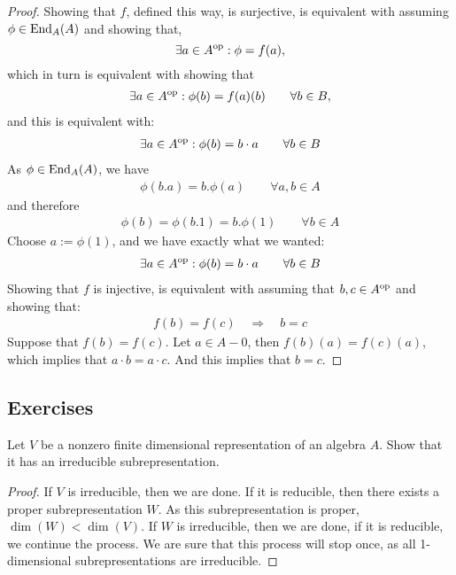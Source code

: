 \begin{proof}
Showing that \(f\), defined this way, is surjective, is equivalent with assuming \(\phi \in \operatorname{End}_{A} (A)\) and showing that,
\[
\exists a\in A^{\operatorname{op}}\space : \space \phi =f(a),
\]
which in turn is equivalent with showing that
\begin{align*}
\exists a\in A^{\operatorname{op}}\space : \space \phi (b)=f(a)(b) \qquad \forall b\in B,
\end{align*}
and this is equivalent with:
\begin{align*}
\exists a\in A^{\operatorname{op}}\space : \space \phi (b)=b\cdot a \qquad \forall b\in B
\end{align*}
As \(\phi \in \operatorname{End}_{A} (A)\), we have
\begin{align*}
\phi (b.a)=b.\phi (a) \qquad \forall a,b\in A
\end{align*}
and therefore
\begin{align*}
\phi (b)=\phi (b.1)=b.\phi (1) \qquad \forall b\in A
\end{align*}
Choose \(a:=\phi (1)\), and we have exactly what we wanted:
\begin{align*}
\exists a\in A^{\operatorname{op}}\space : \space \phi (b)=b\cdot a \qquad \forall b\in B
\end{align*}
Showing that \(f\) is injective, is equivalent with assuming that \(b,c\in A^{\operatorname{op}}\) and showing that:
\begin{align*}
f(b)=f(c) \quad \Longrightarrow  \quad b=c
\end{align*}
Suppose that \(f(b)=f(c)\). Let \(a\in A-0\), then \(f(b)(a)=f(c)(a)\), which implies that \(a\cdot b=a\cdot c\). And this implies that $b=c$.
\end{proof}

\subsection*{Exercises}

\begin{thm}
Let \(V\) be a nonzero finite dimensional representation of an algebra \(A\). Show that it has an irreducible subrepresentation.
\end{thm}

\begin{proof}
If $V$ is irreducible, then we are done. If it is reducible, then there exists a proper subrepresentation $W$. As this subrepresentation is proper, $\dim(W) < \dim (V)$. If $W$ is irreducible, then we are done, if it is reducible, we continue the process. We are sure that this process will stop once, as all 1-dimensional subrepresentations are irreducible.
\end{proof}

